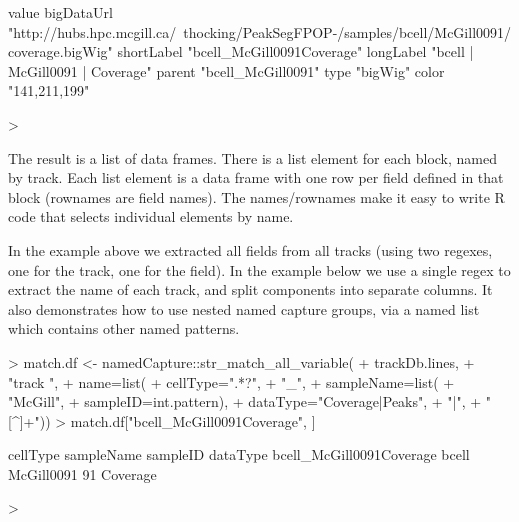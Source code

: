 \begin{Schunk}
\begin{Soutput}
           value                                                                                      
bigDataUrl "http://hubs.hpc.mcgill.ca/~thocking/PeakSegFPOP-/samples/bcell/McGill0091/coverage.bigWig"
shortLabel "bcell_McGill0091Coverage"                                                                 
longLabel  "bcell | McGill0091 | Coverage"                                                            
parent     "bcell_McGill0091"                                                                         
type       "bigWig"                                                                                   
color      "141,211,199"                                                                              
\end{Soutput}
\begin{Sinput}
> 
\end{Sinput}
\end{Schunk}

The result is a list of data frames. 
There is a list element for each block, named by track. Each list
element is a data frame with one row per field defined in that
block (rownames are field names). The names/rownames make it easy
to write R code that selects individual elements by name.

In the example above we extracted all fields from all tracks (using
two regexes, one for the track, one for the field). In the example
below we use a single regex to extract the name of each track, and split
components into separate columns. It also demonstrates how to use nested named
capture groups, via a named list which contains other named patterns.

\begin{Schunk}
\begin{Sinput}
> match.df <- namedCapture::str_match_all_variable(
+   trackDb.lines,
+   "track ",
+   name=list(
+     cellType=".*?",
+     "_",
+     sampleName=list(
+       "McGill",
+       sampleID=int.pattern),
+     dataType="Coverage|Peaks",
+     "|",
+     "[^\n]+")) 
> match.df["bcell_McGill0091Coverage", ] 
\end{Sinput}
\begin{Soutput}
                         cellType sampleName sampleID dataType
bcell_McGill0091Coverage    bcell McGill0091       91 Coverage
\end{Soutput}
\begin{Sinput}
> 
\end{Sinput}
\end{Schunk}

